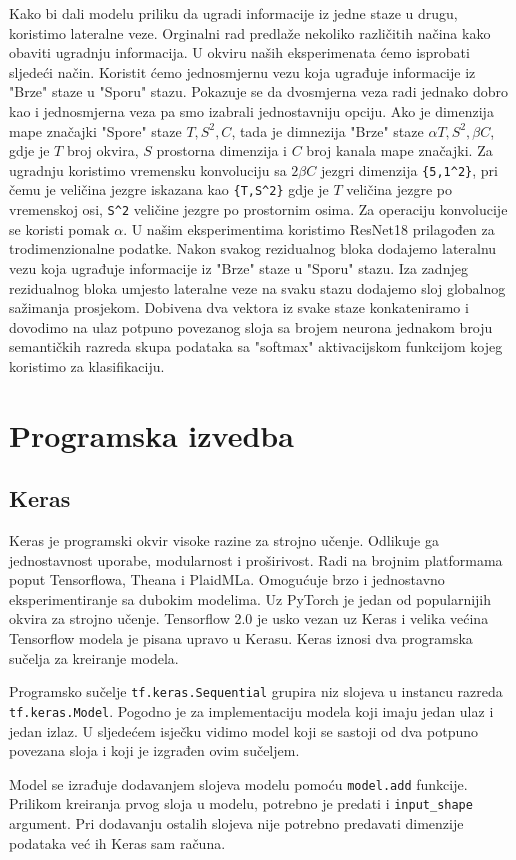 \documentclass[times, utf8, diplomski,  numeric]{fer}
\begin{document}
Kako bi dali modelu priliku da ugradi informacije iz jedne staze u drugu, koristimo lateralne veze. Orginalni rad predlaže nekoliko različitih načina kako obaviti ugradnju informacija. U okviru naših eksperimenata ćemo isprobati sljedeći način. Koristit ćemo jednosmjernu vezu koja ugrađuje informacije iz "Brze" staze u "Sporu" stazu. Pokazuje se da dvosmjerna veza radi jednako dobro kao i jednosmjerna veza pa smo izabrali jednostavniju opciju. Ako je dimenzija mape značajki "Spore" staze ${T, S^2,C}$, tada je dimnezija "Brze" staze ${\alpha T, S^2, \beta C}$, gdje je $T$ broj okvira, $S$ prostorna dimenzija i $C$ broj kanala mape značajki. Za ugradnju koristimo vremensku konvoluciju sa $2\beta C$ jezgri dimenzija \verb|{5,1^2}|, pri čemu je veličina jezgre iskazana kao \verb|{T,S^2}| gdje je $T$ veličina jezgre po vremenskoj osi, \verb|S^2| veličine jezgre po prostornim osima. Za operaciju konvolucije se koristi pomak $\alpha$. U našim eksperimentima koristimo ResNet18 prilagođen za trodimenzionalne podatke. Nakon svakog rezidualnog bloka dodajemo lateralnu vezu koja ugrađuje informacije iz "Brze" staze u "Sporu" stazu. Iza zadnjeg rezidualnog bloka umjesto lateralne veze na svaku stazu dodajemo sloj globalnog sažimanja prosjekom. Dobivena dva vektora iz svake staze konkateniramo i dovodimo na ulaz potpuno povezanog sloja sa brojem neurona jednakom broju semantičkih razreda skupa podataka sa "softmax" aktivacijskom funkcijom kojeg koristimo za klasifikaciju.
\chapter{Programska izvedba}
\section{Keras}
Keras je programski okvir visoke razine za strojno učenje. Odlikuje ga jednostavnost uporabe, modularnost i proširivost. Radi na brojnim platformama poput Tensorflowa, Theana i PlaidMLa. Omogućuje brzo i jednostavno eksperimentiranje sa dubokim modelima. Uz PyTorch je jedan od popularnijih okvira za strojno učenje. Tensorflow 2.0 je usko vezan uz Keras i velika većina Tensorflow modela je pisana upravo u Kerasu. Keras iznosi dva programska sučelja za kreiranje modela.
\par
Programsko sučelje \verb|tf.keras.Sequential| grupira niz slojeva u instancu razreda \verb|tf.keras.Model|. Pogodno je za implementaciju modela koji imaju jedan ulaz i jedan izlaz. U sljedećem isječku vidimo model koji se sastoji od dva potpuno povezana sloja i koji je izgrađen ovim sučeljem.

Model se izrađuje dodavanjem slojeva modelu pomoću \verb|model.add| funkcije. Prilikom kreiranja prvog sloja u modelu, potrebno je predati i \verb|input_shape| argument. Pri dodavanju ostalih slojeva nije potrebno predavati dimenzije podataka već ih Keras sam računa. 
\end{document}
